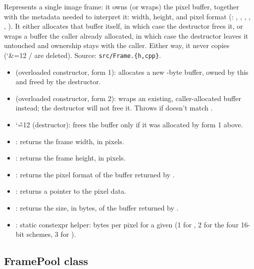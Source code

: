 Represents a single image frame: it owns (or wraps) the pixel buffer, together with the metadata needed to interpret it: width, height, and pixel format (: , , , , , ). It either allocates that buffer itself, in which case the destructor frees it, or wraps a buffer the caller already allocated, in which case the destructor leaves it untouched and ownership stays with the caller. Either way, it never copies ({\catcode`\&=12 }/ are deleted). Source: \lstinline[style=inlineFsRepo]!src/Frame.{h,cpp}!.

\begin{itemize}
    \item {} (overloaded constructor, form 1): allocates a new -byte buffer, owned by this  and freed by the destructor.
    \item {} (overloaded constructor, form 2): wraps an existing, caller-allocated buffer instead; the destructor will not free it. Throws  if  doesn't match .
    \item {\catcode`\~=12 } (destructor): frees the buffer only if it was allocated by form 1 above.
    \item {}: returns the frame width, in pixels.
    \item {}: returns the frame height, in pixels.
    \item {}: returns the pixel format of the buffer returned by .
    \item {}: returns a pointer to the pixel data.
    \item {}: returns the size, in bytes, of the buffer returned by .
    \item {}: static constexpr helper: bytes per pixel for a given  (1 for , 2 for the four 16-bit schemes, 3 for ).
\end{itemize}

\subsection{FramePool class}
\label{subsec:fpgasteel-framepool}

